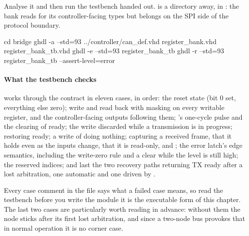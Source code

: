 Analyse it and then run the testbench handed out.  is a directory away, in
: the bank reads  for its controller-facing types but belongs on the
SPI side of the protocol boundary.

\begin{shell}
cd bridge
ghdl -a --std=93 ../controller/can_def.vhd register_bank.vhd register_bank_tb.vhd
ghdl -e --std=93 register_bank_tb
ghdl -r --std=93 register_bank_tb --assert-level=error
\end{shell}

\paragraph{What the testbench checks}
 works through the contract in eleven cases, in order: the reset state
(bit 0 set, everything else zero); write and read back with masking on every writable register, and
the controller-facing outputs following them; 's one-cycle pulse and the clearing of
ready; the write discarded while a transmission is in progress;  restoring ready; a
 write of  doing nothing; capturing a received frame, that it holds even as
the inputs change, that it is read-only, and ; the error latch's edge semantics,
including the write-zero rule and a clear while the level is still high; the reserved indices; and
last the two recovery paths returning TX ready after a lost arbitration, one automatic and one driven
by .

Every case comment in the file says what a failed case means, so read the testbench before you write
the module \textemdash{} it is the executable form of this chapter. The last two cases are
particularly worth reading in advance: without them the node sticks after its first lost arbitration,
and since a two-node bus provokes that in normal operation it is no corner case.
